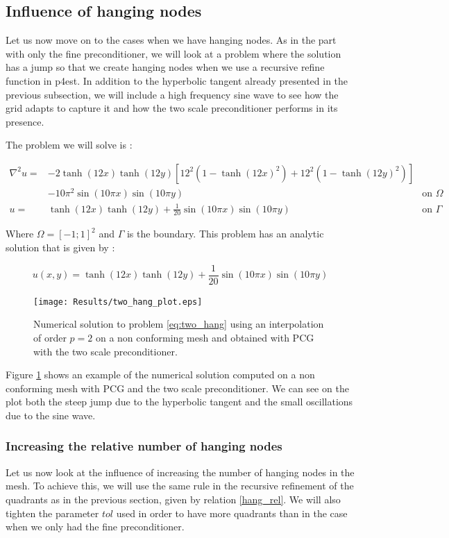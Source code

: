 \subsection{Influence of hanging nodes}

Let us now move on to the cases when we have hanging nodes. As in the part with only the fine preconditioner, we will look at a problem where the solution has a jump so that we create hanging nodes when we use a recursive refine function in p4est. In addition to the hyperbolic tangent already presented in the previous subsection, we will include a high frequency sine wave to see how the grid adapts to capture it and how the two scale preconditioner performs in its presence. 

The problem we will solve is : 

\begin{align}
\nabla^2 u =& -2\tanh(12x)\tanh(12y)\left[ 12^2(1-\tanh(12x)^2) + 12^2(1-\tanh(12y)^2)\right] \nonumber \\
 &-  10\pi^2\sin(10\pi x)\sin(10\pi y) &\text{on $\Omega$} \label{eq:two_hang}\\
u =&   \tanh(12x)\tanh(12y) + \frac{1}{20}\sin(10\pi x)\sin(10\pi y)&\text{on $\Gamma$}
\end{align}

Where $\Omega = [-1;1]^2$ and $\Gamma$ is the boundary. This problem has an analytic solution that is given by : 

$$u(x,y) = \tanh(12x)\tanh(12y) + \frac{1}{20}\sin(10\pi x)\sin(10\pi y)$$

\begin{figure}
\centering
\texttt{[image: Results/two\_hang\_plot.eps]}
\caption{Numerical solution to problem \ref{eq:two_hang} using an interpolation of order $p=2$ on a non conforming mesh and obtained with PCG with the two scale preconditioner.}
\label{two_hang_plot}
\end{figure}

Figure \ref{two_hang_plot} shows an example of the numerical solution computed on a non conforming mesh with PCG and the two scale preconditioner. We can see on the plot both the steep jump due to the hyperbolic tangent and the small oscillations due to the sine wave.

\subsubsection{Increasing the relative number of hanging nodes}

Let us now look at the influence of increasing the number of hanging nodes in the mesh. To achieve this, we will use the same rule in the recursive refinement of the quadrants as in the previous section, given by relation \ref{hang_rel}. We will also tighten the parameter $tol$ used in order to have more quadrants than in the case when we only had the fine preconditioner. 

